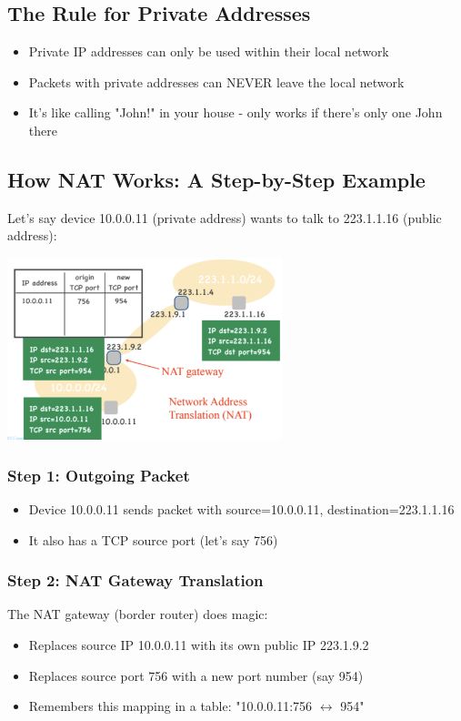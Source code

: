 \documentclass[../../compsys.tex]{subfiles}
\begin{document}
\subsection{The Rule for Private Addresses}
\begin{itemize}
    \item Private IP addresses can only be used within their local network
    \item Packets with private addresses can NEVER leave the local network
    \item It's like calling "John!" in your house - only works if there's only one John there
\end{itemize}

\subsection{How NAT Works: A Step-by-Step Example}
Let's say device 10.0.0.11 (private address) wants to talk to 223.1.1.16 (public address):

\begin{center}
    \includegraphics[width=0.6\textwidth]{images/nat.png}
\end{center}

\subsubsection{Step 1: Outgoing Packet}
\begin{itemize}
    \item Device 10.0.0.11 sends packet with source=10.0.0.11, destination=223.1.1.16
    \item It also has a TCP source port (let's say 756)
\end{itemize}

\subsubsection{Step 2: NAT Gateway Translation}
The NAT gateway (border router) does magic:
\begin{itemize}
    \item Replaces source IP 10.0.0.11 with its own public IP 223.1.9.2
    \item Replaces source port 756 with a new port number (say 954)
    \item Remembers this mapping in a table: "10.0.0.11:756 $\leftrightarrow$ 954"
\end{itemize}
\end{document}
